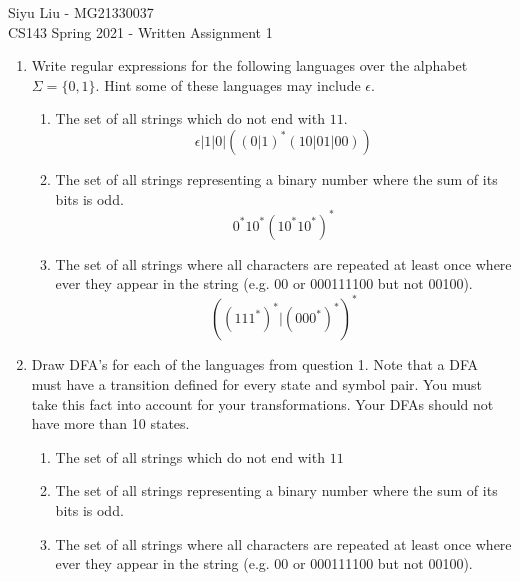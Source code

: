 \documentclass[11pt]{article}
\begin{document}
\begin{center}
\LARGE Siyu Liu - MG21330037 \\
\LARGE CS143 Spring 2021 - Written Assignment 1 \\
\end{center}

\begin{enumerate}
\item Write regular expressions for the following languages over the alphabet $\Sigma = \{0, 1\}$.  Hint some of these languages may include $\epsilon$.
\begin{enumerate}
    \item The set of all strings which do not end with $11$.
    \[
        \epsilon|1|0|((0|1)^*(10|01|00))
    \]
    \item The set of all strings representing a binary number where the sum of its bits is odd.
    \[
        0^*10^*(10^*10^*)^*
    \]
    \item The set of all strings where all characters are repeated at least once where ever they appear in the string (e.g. 00 or 000111100 but not 00100).
    \[
        ((111^*)^*|(000^*)^*)^*
    \]
\end{enumerate}

\newpage

\item Draw DFA's for each of the languages from question 1. Note that a DFA must have a transition defined for every state and symbol pair. You must take this fact into account for your transformations. Your DFAs should not have more than 10 states.

\begin{enumerate}
    \item The set of all strings which do not end with $11$ \\
    \item The set of all strings representing a binary number where the sum of its bits is odd. \\
    \item The set of all strings where all characters are repeated at least once where ever they appear in the string (e.g. 00 or 000111100 but not 00100). \\
\end{enumerate}


\end{enumerate}
\end{document}
